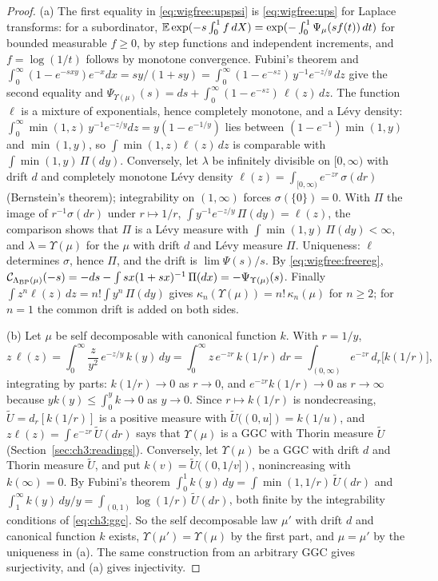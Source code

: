\begin{proof}
(a) The first equality in \eqref{eq:wigfree:upspsi} is \eqref{eq:wigfree:ups} for Laplace transforms: for a subordinator, $\mathbb{E}\exp(-s\int_0^1f\,dX)=\exp(-\int_0^1\Psi_\mu(sf(t))\,dt)$ for bounded measurable $f\ge0$, by step functions and independent increments, and $f=\log(1/t)$ follows by monotone convergence. Fubini's theorem and $\int_0^\infty(1-e^{-sxy})e^{-x}dx=sy/(1+sy)=\int_0^\infty(1-e^{-sz})\,y^{-1}e^{-z/y}\,dz$ give the second equality and $\Psi_{\Upsilon(\mu)}(s)=ds+\int_0^\infty(1-e^{-sz})\,\ell(z)\,dz$. The function $\ell$ is a mixture of exponentials, hence completely monotone, and a L\'evy density: $\int_0^\infty\min(1,z)\,y^{-1}e^{-z/y}dz=y(1-e^{-1/y})$ lies between $(1-e^{-1})\min(1,y)$ and $\min(1,y)$, so $\int\min(1,z)\ell(z)\,dz$ is comparable with $\int\min(1,y)\,\Pi(dy)$. Conversely, let $\lambda$ be infinitely divisible on $[0,\infty)$ with drift $d$ and completely monotone L\'evy density $\ell(z)=\int_{[0,\infty)}e^{-zr}\,\sigma(dr)$ (Bernstein's theorem); integrability on $(1,\infty)$ forces $\sigma(\{0\})=0$. With $\Pi$ the image of $r^{-1}\sigma(dr)$ under $r\mapsto1/r$, $\int y^{-1}e^{-z/y}\,\Pi(dy)=\ell(z)$, the comparison shows that $\Pi$ is a L\'evy measure with $\int\min(1,y)\,\Pi(dy)<\infty$, and $\lambda=\Upsilon(\mu)$ for the $\mu$ with drift $d$ and L\'evy measure $\Pi$. Uniqueness: $\ell$ determines $\sigma$, hence $\Pi$, and the drift is $\lim\Psi(s)/s$. By \eqref{eq:wigfree:freereg}, $\mathcal C_{\Lambda_{\rm BP}(\mu)}(-s)=-ds-\int sx(1+sx)^{-1}\,\Pi(dx)=-\Psi_{\Upsilon(\mu)}(s)$. Finally $\int z^n\ell(z)\,dz=n!\int y^n\,\Pi(dy)$ gives $\kappa_n(\Upsilon(\mu))=n!\,\kappa_n(\mu)$ for $n\ge2$; for $n=1$ the common drift is added on both sides.

(b) Let $\mu$ be self decomposable with canonical function $k$. With $r=1/y$,
\[
z\,\ell(z)=\int_0^\infty\frac z{y^2}\,e^{-z/y}\,k(y)\,dy=\int_0^\infty z\,e^{-zr}\,k(1/r)\,dr=\int_{(0,\infty)}e^{-zr}\,d_r\big[k(1/r)\big],
\]
integrating by parts: $k(1/r)\to0$ as $r\to0$, and $e^{-zr}k(1/r)\to0$ as $r\to\infty$ because $yk(y)\le\int_0^yk\to0$ as $y\to0$. Since $r\mapsto k(1/r)$ is nondecreasing, $\widetilde U=d_r[k(1/r)]$ is a positive measure with $\widetilde U((0,u])=k(1/u)$, and $z\ell(z)=\int e^{-zr}\,\widetilde U(dr)$ says that $\Upsilon(\mu)$ is a GGC with Thorin measure $\widetilde U$ (Section~\ref{sec:ch3:readings}). Conversely, let $\Upsilon(\mu)$ be a GGC with drift $d$ and Thorin measure $\widetilde U$, and put $k(v)=\widetilde U((0,1/v])$, nonincreasing with $k(\infty)=0$. By Fubini's theorem $\int_0^1k(y)\,dy=\int\min(1,1/r)\,\widetilde U(dr)$ and $\int_1^\infty k(y)\,dy/y=\int_{(0,1)}\log(1/r)\,\widetilde U(dr)$, both finite by the integrability conditions of \eqref{eq:ch3:ggc}. So the self decomposable law $\mu'$ with drift $d$ and canonical function $k$ exists, $\Upsilon(\mu')=\Upsilon(\mu)$ by the first part, and $\mu=\mu'$ by the uniqueness in (a). The same construction from an arbitrary GGC gives surjectivity, and (a) gives injectivity.


\end{proof}
